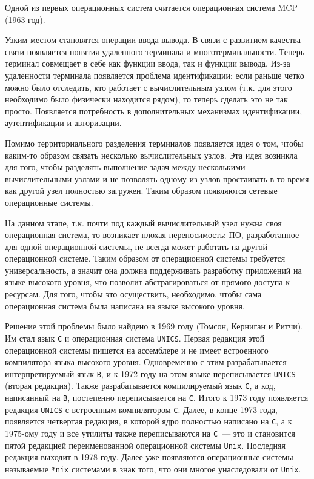 Одной из первых операционных систем считается операционная система MCP (1963
год).


Узким местом становятся операции ввода-вывода. В связи с развитием качества
связи появляется понятия удаленного терминала и многотерминальности. Теперь
терминал совмещает в себе как функции ввода, так и функции вывода. Из-за
удаленности терминала появляется проблема идентификации: если раньше четко можно
было отследить, кто работает с вычислительным узлом (т.к. для этого необходимо
было физически находится рядом), то теперь сделать это не так просто. Появляется
потребность в дополнительных механизмах идентификации, аутентификации и
авторизации.

Помимо территориального разделения терминалов появляется идея о том, чтобы
каким-то образом связать несколько вычислительных узлов. Эта идея возникла для
того, чтобы разделять выполнение задач между несколькими вычислительными узлами
и не позволять одному из узлов простаивать в то время как другой узел полностью
загружен. Таким образом появляются сетевые операционные системы.


На данном этапе, т.к. почти под каждый вычислительный узел нужна своя
операционная система, то возникает плохая переносимость: ПО, разработанное для
одной операционной системы, не всегда может работать на другой операционной
системе. Таким образом от операционной системы требуется универсальность, а
значит она должна поддерживать разработку приложений на языке высокого уровня,
что позволит абстрагироваться от прямого доступа к ресурсам. Для того, чтобы это
осуществить, необходимо, чтобы сама операционная система была написана на языке
высокого уровня.

Решение этой проблемы было найдено в 1969 году (Томсон, Керниган и Ритчи). Им
стал язык \texttt{С} и операционная система \texttt{UNICS}. Первая редакция этой
операционной системы пишется на ассемблере и не имеет встроенного компилятора
языка высокого уровня. Одновременно с этим разрабатывается интерпретируемый язык
\texttt{B}, и к 1972 году на этом языке переписывается \texttt{UNICS} (вторая
редакция). Также разрабатывается компилируемый язык \texttt{С}, а код,
написанный на \texttt{B}, постепенно переписывается на \texttt{C}. Итого к 1973
году появляется редакция \texttt{UNICS} с встроенным компилятором \texttt{C}.
Далее, в конце 1973 года, появляется четвертая редакция, в которой ядро
полностью написано на \texttt{С}, а к 1975-ому году и все утилиты также
переписываются на \texttt{С}~--- это и становится пятой редакцией
переименованной операционной системы \texttt{Unix}. Последняя редакция выходит в
1978 году. Далее уже появляются операционные системы называемые \texttt{*nix}
системами в знак того, что они многое унаследовали от \texttt{Unix}.

